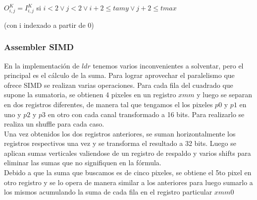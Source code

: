 \begin{center}
$O_{i,j}^{K} = I_{i,j}^{K}$ si $i<2 \vee j<2 \vee i+2 \leq tamy \vee j +2 \leq tmax$
\end{center}

(con i indexado a partir de 0)

\subsubsection{Assembler SIMD}

En la implementación de $ldr$ tenemos varios inconvenientes a solventar, pero el principal es el cálculo de la suma. Para lograr aprovechar el paralelismo que ofrece SIMD se realizan varias operaciones.
Para cada fila del cuadrado que supone la sumatoria, se obtienen 4 pixeles en un registro $xmm$ y luego se separan en dos registros diferentes, de manera tal que tengamos el los pixeles $p0$ y $p1$ en uno y $p2$ y $p3$ en otro con cada canal transformado a 16 bits. Para realizarlo se realiza un shuffle para cada caso.\\

Una vez obtenidos los dos registros anteriores, se suman horizontalmente los registros respectivos una vez y se transforma el resultado a 32 bits. Luego se aplican sumas verticales valiendose de un registro de respaldo y varios shifts para eliminar las sumas que no signifiquen en la fórmula.\\

Debido a que la suma que buscamos es de cinco pixeles, se obtiene el 5to pixel en otro registro y se lo opera de manera similar a los anteriores para luego sumarlo a los mismos acumulando la suma de cada fila en el registro particular $xmm0$

